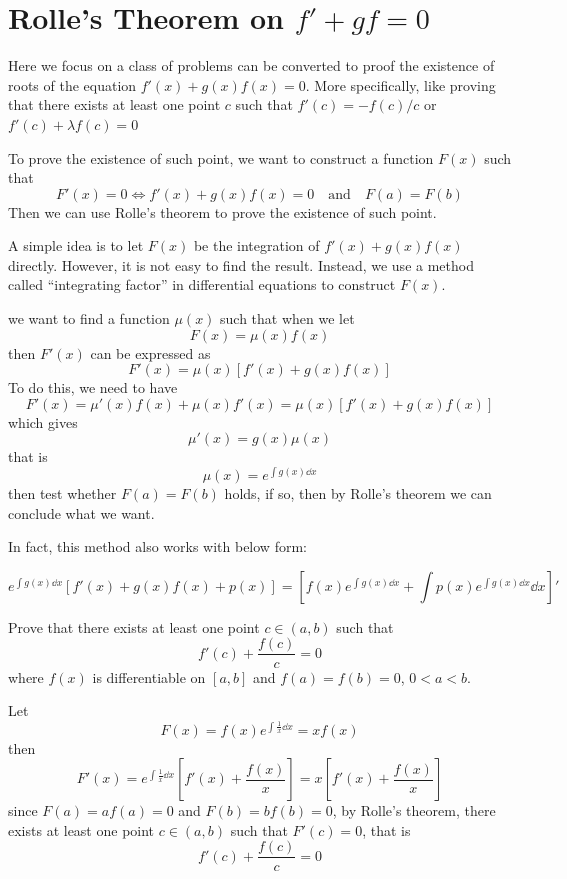 \documentclass{overview}
\begin{document}
\section{Rolle's Theorem on $f'+gf=0$}

Here we focus on a class of problems can be converted to proof the existence
of roots of the equation $f'(x) + g(x) f(x) = 0$. More specifically, like proving
that there exists at least one point $c$ such that $f'(c)=-f(c) / c$ or $f'(c)+\lambda f(c)=0$

To prove the existence of such point, we want to construct a function $F(x)$ such that
\[
	F'(x) = 0 \iff f'(x) + g(x) f(x) = 0 \quad \text{and} \quad F(a) = F(b)
\] 
Then we can use Rolle's theorem to prove the existence of such point.

A simple idea is to let $F(x)$ be the integration of $f'(x) + g(x) f(x)$ directly.
However, it is not easy to find the result. Instead, we use a method called
``integrating factor'' in differential equations to construct $F(x)$.

we want to find a function $\mu(x)$ such that when we let
\[
	F(x) = \mu(x) f(x)
\]
then $F'(x)$ can be expressed as
\[
	F'(x) = \mu(x) [f'(x) + g(x) f(x)]
\]
To do this, we need to have
\[
	F'(x) = \mu'(x) f(x) + \mu(x) f'(x) = \mu(x) [f'(x) + g(x) f(x)]
\]
which gives
\[
	\mu'(x) = g(x) \mu(x)
\]
that is
\[
	\mu(x) = e^{\int g(x) \dd x}
\]
then test whether $F(a) = F(b)$ holds, if so, then by Rolle's theorem we can
conclude what we want.

In fact, this method also works with below form:
\begin{theorem}
	\[
		e^{\int g(x) \dd x} [f'(x)+g(x)f(x)+p(x)] = \left[f(x)
		e^{\int g(x) \dd x} + \int p(x) e^{\int g(x) \dd x} \dd x \right]'
	\] 
\end{theorem}
\begin{example}
	Prove that there exists at least one point $c \in (a,b)$ such that
	\[
		f'(c) + \frac{f(c)}{c} = 0
	\] 
	where $f(x)$ is differentiable on $[a,b]$ and $f(a) = f(b) = 0$,
	$0 < a < b$.
	\begin{answer}
		Let
		\[
			F(x) = f(x) e^{\int \frac{1}{x} \dd x} = x f(x)
		\] 
		then
		\[
			F'(x) = e^{\int \frac{1}{x} \dd x} [f'(x) + \frac{f(x)}{x}] =
			x [f'(x) + \frac{f(x)}{x}]
		\] 
		since $F(a) = a f(a) = 0$ and $F(b) = b f(b) = 0$, by Rolle's theorem,
		there exists at least one point $c \in (a,b)$ such that $F'(c) = 0$,
		that is
		\[
			f'(c) + \frac{f(c)}{c} = 0
		\]
	\end{answer}
\end{example}
\end{document}
